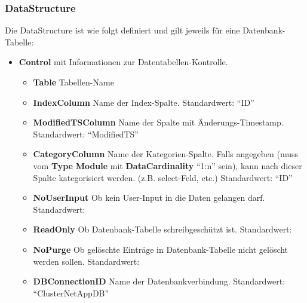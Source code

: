         \subsubsection{DataStructure}
            Die DataStructure ist wie folgt definiert und gilt jeweils für eine Datenbank-Tabelle:
            \begin{itemize}
                \item \textbf{Control}
                     mit Informationen zur Datentabellen-Kontrolle.
                    \begin{itemize}
                        \item \textbf{Table}\superscript{*}  Tabellen-Name
                        \item \textbf{IndexColumn}\superscript{*}  Name der Index-Spalte. Standardwert: ``ID''
                        \item \textbf{ModifiedTSColumn}\superscript{*}  Name der Spalte mit Änderungs-Timestamp. Standardwert: ``ModifiedTS''
                        \item \textbf{CategoryColumn}\superscript{*}  Name der Kategorien-Spalte. Falls angegeben (muss vom \textbf{Type} \textbf{Module} mit \textbf{DataCardinality} ``1:n'' sein), kann nach
                        dieser Spalte kategorisiert werden. (z.B. select-Feld, etc.) Standardwert: ``ID''
                        \item \textbf{NoUserInput}\superscript{*}  Ob kein User-Input in die Daten gelangen darf. Standardwert:  
                        \item \textbf{ReadOnly}\superscript{*}  Ob Datenbank-Tabelle schreibgeschützt ist. Standardwert:  
                        \item \textbf{NoPurge}\superscript{*}  Ob gelöschte Einträge in Datenbank-Tabelle nicht gelöscht werden sollen. Standardwert:  
                        \item \textbf{DBConnectionID}\superscript{*}  Name der Datenbankverbindung. Standardwert: ``ClusterNetAppDB''


\end{itemize}
\end{itemize}
